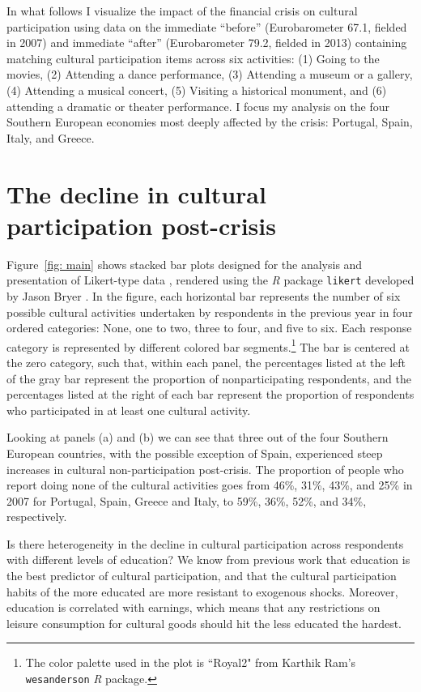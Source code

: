\documentclass{article}
\begin{document}
In what follows I visualize the impact of the financial crisis on cultural participation using data on the immediate ``before'' (Eurobarometer 67.1, fielded in 2007) and immediate ``after'' (Eurobarometer 79.2, fielded in 2013) containing matching cultural participation items across six activities: (1) Going to the movies, (2) Attending a dance performance, (3) Attending a museum or a gallery, (4) Attending a musical concert, (5) Visiting a historical monument, and (6) attending a dramatic or theater performance. I focus my analysis on the four Southern European economies most deeply affected by the crisis: Portugal, Spain, Italy, and Greece. 

\section{The decline in cultural participation post-crisis}
Figure~\ref{fig: main} shows stacked bar plots designed for the analysis and presentation of Likert-type data \citep{heiberger2014design}, rendered using the {\em} {\em R} package \texttt{likert} developed by Jason Bryer \citeyearpar{bryer-likert}. In the figure, each horizontal bar represents the number of six possible cultural activities undertaken by respondents in the previous year in four ordered categories: None, one to two, three to four, and five to six. Each response category is represented by different colored bar segments.\footnote{The color palette used in the plot is ``Royal2" from Karthik Ram's \citeyearpar{Ram_wespalette} \texttt{wesanderson} {\em R} package.} The bar is centered at the zero category, such that, within each panel, the percentages listed at the left of the gray bar represent the proportion of nonparticipating respondents, and the percentages listed at the right of each bar represent the proportion of respondents who participated in at least one cultural activity. 

Looking at panels (a) and (b) we can see that three out of the four Southern European countries, with the possible exception of Spain, experienced steep increases in cultural non-participation post-crisis. The proportion of people who report doing none of the cultural activities goes from 46\%, 31\%, 43\%, and 25\% in 2007 for Portugal, Spain, Greece and Italy, to 59\%, 36\%, 52\%, and 34\%, respectively. 

Is there heterogeneity in the decline in cultural participation across respondents with different levels of education? We know from previous work that education is the best predictor of cultural participation, and that the cultural participation habits of the more educated are more resistant to exogenous shocks. Moreover, education is correlated with earnings, which means that any restrictions on leisure consumption for cultural goods should hit the less educated the hardest. 
\end{document}
